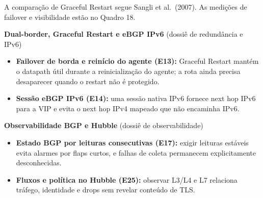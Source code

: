 \documentclass[12pt,openany,oneside,a4paper,chapter=TITLE,english,brazil]{abntex2}
\providecommand{\tightlist}{\setlength{\itemsep}{0pt}\setlength{\parskip}{0pt}}
\begin{document}
A comparação de Graceful Restart segue Sangli et al.~(2007). As medições de failover e visibilidade estão no Quadro 18.

\textbf{Dual-border, Graceful Restart e eBGP IPv6} (dossiê de redundância e IPv6)

\begin{itemize}
\tightlist
\item
  \textbf{Failover de borda e reinício do agente (E13):} Graceful Restart mantém o datapath útil durante a reinicialização do agente; a rota ainda precisa desaparecer quando o restart não é protegido.
\item
  \textbf{Sessão eBGP IPv6 (E14):} uma sessão nativa IPv6 fornece next hop IPv6 para a VIP e evita o next hop IPv4 mapeado que não encaminha IPv6.
\end{itemize}

\textbf{Observabilidade BGP e Hubble} (dossiê de observabilidade)

\begin{itemize}
\tightlist
\item
  \textbf{Estado BGP por leituras consecutivas (E17):} exigir leituras estáveis evita alarmes por flaps curtos, e falhas de coleta permanecem explicitamente desconhecidas.
\item
  \textbf{Fluxos e política no Hubble (E25):} observar L3/L4 e L7 relaciona tráfego, identidade e drops sem revelar conteúdo de TLS.
\end{itemize}
\end{document}
